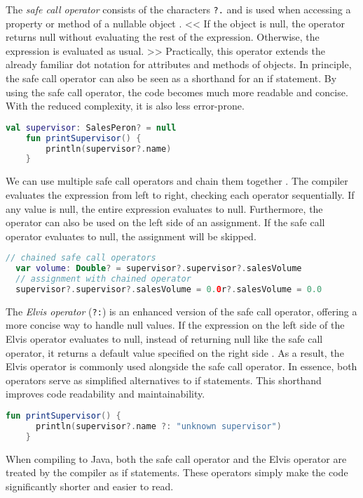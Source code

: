 \documentclass[a4paper, 11pt]{article}
\begin{document}
  The \textit{safe call operator} consists of the characters \texttt{?.} and is used when accessing a property or method of a nullable object \cite{nullsafety-safe-call}. << If the object is null, the operator returns null without evaluating the rest of the expression. Otherwise, the expression is evaluated as usual. >> Practically, this operator extends the already familiar dot notation for attributes and methods of objects. In principle, the safe call operator can also be seen as a shorthand for an if statement. By using the safe call operator, the code becomes much more readable and concise. With the reduced complexity, it is also less error-prone.
  \begin{lstlisting}[language=Kotlin]
    val supervisor: SalesPeron? = null
    fun printSupervisor() {
        println(supervisor?.name)
    }
  \end{lstlisting}
  We can use multiple safe call operators and chain them together \cite{nullsafety-safe-call}. The compiler evaluates the expression from left to right, checking each operator sequentially. If any value is null, the entire expression evaluates to null.
  Furthermore, the operator can also be used on the left side of an assignment. If the safe call operator evaluates to null, the assignment will be skipped.
  \begin{lstlisting}[language=Kotlin]
  // chained safe call operators
  var volume: Double? = supervisor?.supervisor?.salesVolume
  // assignment with chained operator
  supervisor?.supervisor?.salesVolume = 0.0r?.salesVolume = 0.0
  \end{lstlisting}

  The \textit{Elvis operator} (\texttt{?:}) is an enhanced version of the safe call operator, offering a more concise way to handle null values. If the expression on the left side of the Elvis operator evaluates to null, instead of returning null like the safe call operator, it returns a default value specified on the right side \cite{nullsafety-elvis}. As a result, the Elvis operator is commonly used alongside the safe call operator. In essence, both operators serve as simplified alternatives to if statements. This shorthand improves code readability and maintainability. %
  \begin{lstlisting}[language=Kotlin]
    fun printSupervisor() {
      println(supervisor?.name ?: "unknown supervisor")
    }
  \end{lstlisting}
  When compiling to Java, both the safe call operator and the Elvis operator are treated by the compiler as if statements. These operators simply make the code significantly shorter and easier to read.
 
\end{document}
